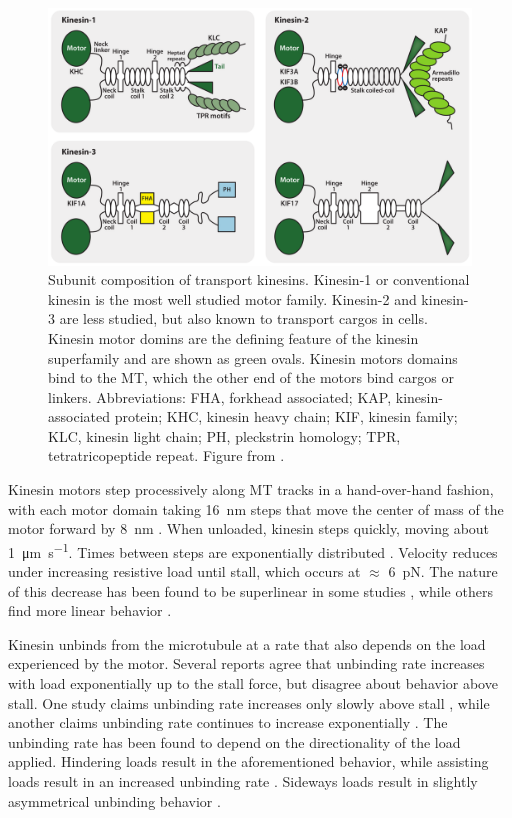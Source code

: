 \begin{figure}
\includegraphics[width=\textwidth]{background/kinesin_types}
\caption[Composition of transport kinesins]{Subunit composition of transport kinesins. Kinesin-1 or conventional kinesin is the most well studied motor family. Kinesin-2 and kinesin-3 are less studied, but also known to transport cargos in cells. Kinesin motor domins are the defining feature of the kinesin superfamily and are shown as green ovals. Kinesin motors domains bind to the MT, which the other end of the motors bind cargos or linkers. Abbreviations: FHA, forkhead associated; KAP, kinesin-associated protein; KHC, kinesin heavy chain; KIF, kinesin family; KLC, kinesin light chain; PH, pleckstrin homology; TPR, tetratricopeptide repeat. Figure from \cite{Verhey2011}.}
\label{fig:kinesin_types}
\end{figure}

Kinesin motors step processively along MT tracks in a hand-over-hand fashion, with each motor domain taking \SI{16}{\nano\meter} steps \cite{Yildiz2004} that move the center of mass of the motor forward by \SI{8}{\nano\meter} \cite{Svoboda1993}. When unloaded, kinesin steps quickly, moving about \SI{1}{\micro\meter\per\second}. Times between steps are exponentially distributed \cite{Carter2005}. Velocity reduces under increasing resistive load until stall, which occurs at $\approx$ \SI{6}{\pico\newton}. The nature of this decrease has been found to be superlinear in some studies \cite{Kunwar2010,Visscher1999,Fallesen2011,Rai2013}, while others find more linear behavior \cite{Svoboda1994,Andreasson2015a}.

Kinesin unbinds from the microtubule at a rate that also depends on the load experienced by the motor. Several reports agree that unbinding rate increases with load exponentially up to the stall force, but disagree about behavior above stall. One study claims unbinding rate increases only slowly above stall \cite{Kunwar2011}, while another claims unbinding rate continues to increase exponentially \cite{Andreasson2015a}. The unbinding rate has been found to depend on the directionality of the load applied. Hindering loads result in the aforementioned behavior, while assisting loads result in an increased unbinding rate \cite{Milic2014,Andreasson2015a}. Sideways loads result in slightly asymmetrical unbinding behavior \cite{Block2003}.

